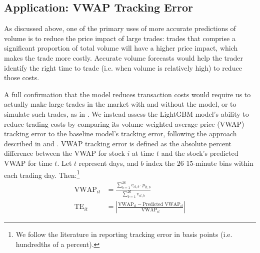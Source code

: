 \documentclass[12pt]{article}
\begin{document}
\subsection{Application: VWAP Tracking Error}
As discussed above, one of the primary uses of more accurate predictions of volume is to reduce the price impact of large trades: trades that comprise a significant proportion of total volume will have a higher price impact, which makes the trade more costly. Accurate volume forecasts would help the trader identify the right time to trade (i.e. when volume is relatively high) to reduce those costs.

A full confirmation that the model reduces transaction costs would require us to actually make large trades in the market with and without the model, or to simulate such trades, as in \textcite{satish2014predicting}. We instead assess the LightGBM model's ability to reduce trading costs by comparing its volume-weighted average price (VWAP) tracking error to the baseline model's tracking error, following the approach described in \textcite{chen2016forecasting} and \textcite{cucuringu2025forecasting}. VWAP tracking error is defined as the absolute percent difference between the VWAP for stock $i$ at time $t$ and the stock's predicted VWAP for time $t$. Let $t$ represent days, and $b$ index the 26 15-minute bins within each trading day. Then:\footnote{We follow the literature in reporting tracking error in basis points (i.e. hundredths of a percent).}
\begin{align}
    \text{VWAP}_{it} &= \frac{\sum_{b=1}^{26} v_{it,b} \cdot p_{it,b}}{\sum_{b=1}^{26} v_{it,b}} \\
    \text{TE}_{it} &= \left| \frac{\text{VWAP}_{it} - \text{Predicted VWAP}_{it}}{\text{VWAP}_{it}} \right|
\end{align}
\end{document}
